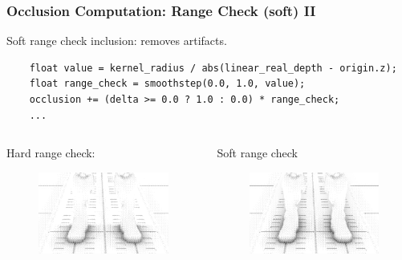 \documentclass{beamer}
\begin{document}
\begin{frame}[fragile]
\frametitle{Occlusion Computation: Range Check (soft) II}
Soft range check inclusion: removes artifacts.
\begin{verbatim}
    float value = kernel_radius / abs(linear_real_depth - origin.z);
    float range_check = smoothstep(0.0, 1.0, value);
    occlusion += (delta >= 0.0 ? 1.0 : 0.0) * range_check;
    ...
\end{verbatim}

\begin{columns}
    \begin{column}{0.45\linewidth}
    \centering
        Hard range check:
        \begin{figure}
            \centering
            \vspace{-1ex}%
            \includegraphics[width=0.8\linewidth]{images/feet_hard_range_check.png}
        \end{figure}
    \end{column}

    \begin{column}{0.45\linewidth}
        \centering
        Soft range check
        \begin{figure}
            \centering
            \vspace{-1ex}%
            \includegraphics[width=0.8\linewidth]{images/feet_soft_range_check.png}
        \end{figure}
    \end{column}
\end{columns}

\end{frame}
\end{document}
